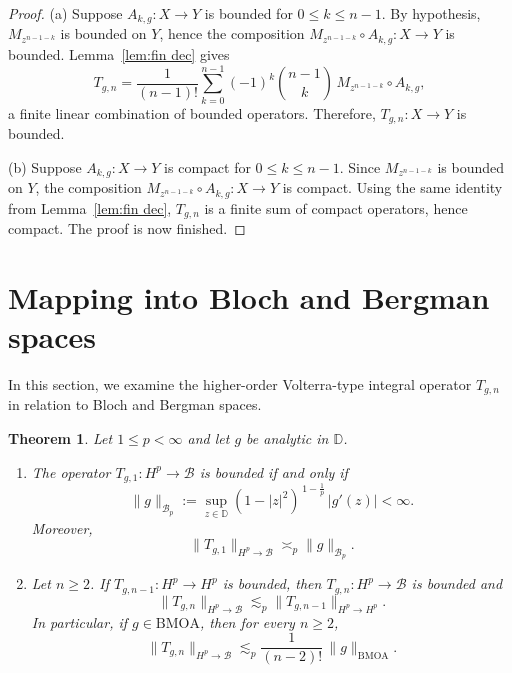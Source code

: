\documentclass[preprint,12pt]{elsarticle}
\numberwithin{equation}{section}
\newtheorem{theorem}{Theorem}[section]
\theoremstyle{remark}
\begin{document}
\begin{proof}
(a) Suppose $A_{k,g}:X\to Y$ is bounded for $0\le k\le n-1$. By hypothesis, $M_{z^{n-1-k}}$
is bounded on $Y$, hence the composition $M_{z^{n-1-k}}\circ A_{k,g}:X\to Y$ is bounded.
Lemma~\ref{lem:fin dec} gives
\begin{equation*}
T_{g,n}
=\frac{1}{(n-1)!}\sum_{k=0}^{n-1}(-1)^k\binom{n-1}{k}\,M_{z^{n-1-k}}\circ A_{k,g},
\end{equation*}
a finite linear combination of bounded operators. Therefore, $T_{g,n}:X\to Y$ is bounded.

\noindent
(b) Suppose $A_{k,g}:X\to Y$ is compact for $0\le k\le n-1$. Since $M_{z^{n-1-k}}$ is
bounded on $Y$, the composition $M_{z^{n-1-k}}\circ A_{k,g}:X\to Y$ is compact.
Using the same identity from Lemma~\ref{lem:fin dec}, $T_{g,n}$ is a finite sum of compact
operators, hence compact. The proof is now finished.
\end{proof}



\section{Mapping into Bloch and Bergman spaces}

In this section, we examine the higher-order Volterra-type integral operator $T_{g,n}$ in relation to Bloch and Bergman spaces.


\begin{theorem}\label{thm:bloch}
Let $1\le p<\infty$ and let $g$ be analytic in $\mathbb D$.
\begin{enumerate}
\item[(i)] The operator $T_{g,1}:H^p\to\mathcal B$ is bounded if and only if
\begin{equation}\label{eq:bloch-symbol-n1}
\|g\|_{\mathcal B_{p}}
:=\sup_{z\in\mathbb D}(1-|z|^2)^{\,1-\frac1p}\,|g'(z)|<\infty.
\end{equation}
Moreover,
\begin{equation*}
\|T_{g,1}\|_{H^p\to\mathcal B}\asymp_{p} \|g\|_{\mathcal B_{p}} .
\end{equation*}

\item[(ii)] Let $n\ge2$. If $T_{g,n-1}:H^p\to H^p$ is bounded, then $T_{g,n}:H^p\to\mathcal B$
is bounded and
\begin{equation}\label{eq:Hp-to-bloch-n}
\|T_{g,n}\|_{H^p\to\mathcal B}\lesssim_{p}\|T_{g,n-1}\|_{H^p\to H^p}.
\end{equation}
In particular, if $g\in\mathrm{BMOA}$, then for every $n\ge2$,
\begin{equation*}
\|T_{g,n}\|_{H^p\to\mathcal B}\lesssim_{p}\frac{1}{(n-2)!}\,\|g\|_{\mathrm{BMOA}}.
\end{equation*}
\end{enumerate}
\end{theorem}
\end{document}

